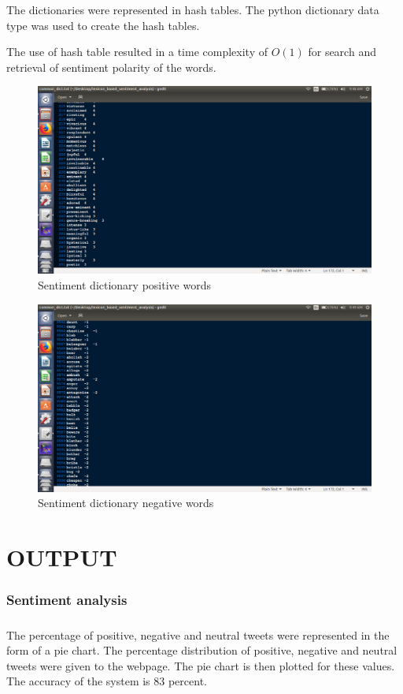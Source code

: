 The dictionaries were represented in hash tables. The python dictionary data type was used to create the hash tables.

The use of hash table resulted in a time complexity of $ O(1) $ for search and retrieval of  sentiment polarity of the words.
\\

\begin{figure}[!ht]
	\centering
	\includegraphics[width=0.8\linewidth]{common_dict1.png}
	\caption{Sentiment dictionary positive words}
	\label{types}
\end{figure}
\begin{figure}[!ht]
	\centering
	\includegraphics[width=0.8\linewidth]{common_dict2.png}
	\caption{Sentiment dictionary negative words}
	\label{types}
\end{figure}


\renewcommand\chaptername{CHAPTER}
\chapter{OUTPUT}
\subsection{Sentiment analysis}
\paragraph{} The percentage of positive, negative and neutral tweets were represented in the form of a pie chart. The percentage distribution of positive, negative and neutral tweets were given to the webpage. The pie chart is then plotted for these values. The accuracy of the system is 83 percent.
\\
